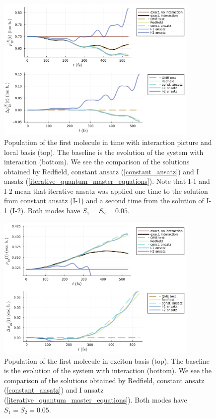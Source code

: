 \newpage
\begin{figure}[H]
\centering
\includegraphics[width=0.87\textwidth]{img/ansatz/iterative02_joined_intloc22.png}
\caption{Population of the first molecule in time with interaction picture and local basis (top). The baseline is the evolution of the system with interaction (bottom). We see the comparison of the solutions obtained by Redfield, constant ansatz (\ref{constant_ansatz}) and I ansatz (\ref{iterative_quantum_master_equations}). Note that I-1 and I-2 mean that iterative ansatz was applied one time to the solution from constant ansatz (I-1) and a second time from the solution of I-1 (I-2). Both modes have $S_1=S_2=0.05$.}
\label{img:iterative02_joined_intloc22}
\end{figure}

\begin{figure}[H]
\centering
\includegraphics[width=0.87\textwidth]{img/ansatz/iterative02_joined_schexc22.png}
\caption{Population of the first molecule in exciton basis (top). The baseline is the evolution of the system with interaction (bottom). We see the comparison of the solutions obtained by Redfield, constant ansatz (\ref{constant_ansatz}) and I ansatz (\ref{iterative_quantum_master_equations}). Both modes have $S_1=S_2=0.05$.}
\label{img:iterative02_joined_schexc22}
\end{figure}

